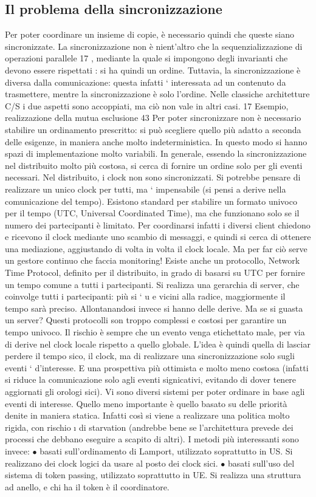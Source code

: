 \subsection{Il problema della sincronizzazione}
Per poter coordinare un insieme di copie, è necessario quindi che queste siano
sincronizzate. La sincronizzazione non è nient'altro che la sequenzializzazione
di operazioni parallele 17 , mediante la quale si impongono degli invarianti che
devono essere rispettati : si ha quindi un ordine.
Tuttavia, la sincronizzazione è diversa dalla comunicazione: questa infatti
` interessata ad un contenuto da trasmettere, mentre la sincronizzazione è solo
l'ordine. Nelle classiche architetture C/S i due aspetti sono accoppiati, ma ciò
non vale in altri casi.
17 Esempio,
realizzazione della mutua esclusione
43
Per poter sincronizzare non è necessario stabilire un ordinamento prescritto:
si può scegliere quello più adatto a seconda delle esigenze, in maniera anche
molto indeterministica. In questo modo si hanno spazi di implementazione
molto variabili. In generale, essendo la sincronizzazione nel distribuito molto
più costosa, si cerca di fornire un ordine solo per gli eventi necessari.
Nel distribuito, i clock non sono sincronizzati. Si potrebbe pensare di realizzare un unico clock per tutti, ma `
impensabile (si pensi a derive nella
comunicazione del tempo). Esistono standard per stabilire un formato univoco per il tempo (UTC, Universal Coordinated
Time), ma che funzionano solo
se il numero dei partecipanti è limitato. Per coordinarsi infatti i diversi client
chiedono e ricevono il clock mediante uno scambio di messaggi, e quindi si cerca
di ottenere una mediazione, aggiustando di volta in volta il clock locale. Ma per
far ciò serve un gestore continuo che faccia monitoring!
Esiste anche un protocollo, Network Time Protocol, definito per il distribuito,
in grado di basarsi su UTC per fornire un tempo comune a tutti i partecipanti.
Si realizza una gerarchia di server, che coinvolge tutti i partecipanti: più si `
u e
vicini alla radice, maggiormente il tempo sarà preciso. Allontanandosi invece si
hanno delle derive. Ma se si guasta un server?
Questi protocolli son troppo complessi e costosi per garantire un tempo univoco. Il rischio è sempre che un evento venga
etichettato male, per via di derive
nel clock locale rispetto a quello globale. L'idea è quindi quella di lasciar perdere
il tempo sico, il clock, ma di realizzare una sincronizzazione solo sugli eventi
`
d'interesse. E una prospettiva più ottimista e molto meno costosa (infatti si
riduce la comunicazione solo agli eventi signicativi, evitando di dover tenere
aggiornati gli orologi sici).
Vi sono diversi sistemi per poter ordinare in base agli eventi di interesse.
Quello meno importante è quello basato su delle priorità denite in maniera
statica. Infatti così si viene a realizzare una politica molto rigida, con rischio
\i{}
di starvation (andrebbe bene se l'architettura prevede dei processi che debbano
eseguire a scapito di altri).
I metodi più interessanti sono invece:
$\bullet$ basati sull'ordinamento di Lamport, utilizzato soprattutto in US. Si realizzano dei clock logici da usare al
posto dei clock sici.
$\bullet$ basati sull'uso del sistema di token passing, utilizzato soprattutto in UE.
Si realizza una struttura ad anello, e chi ha il token è il coordinatore.
